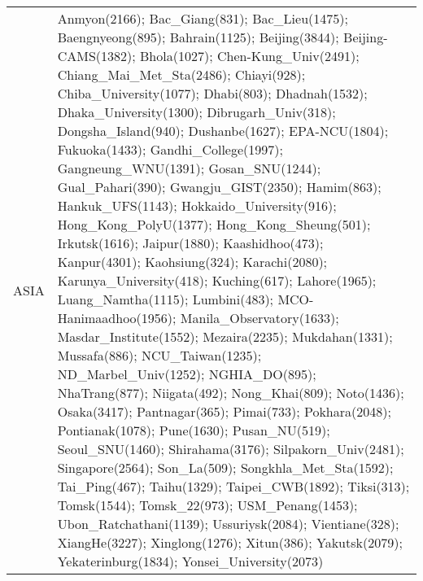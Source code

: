 \documentclass[journal abbreviation, manuscript]{copernicus}
\begin{document}
\begin{table}
\begin{tabularx}{\textwidth}{lX}
      ASIA &                                                                                                                                                                                                                                                                                                                                                                                                                                                                                                                                                                                                                                                                                                                                                        Anmyon(2166); Bac\_Giang(831); Bac\_Lieu(1475); Baengnyeong(895); Bahrain(1125); Beijing(3844); Beijing-CAMS(1382); Bhola(1027); Chen-Kung\_Univ(2491); Chiang\_Mai\_Met\_Sta(2486); Chiayi(928); Chiba\_University(1077); Dhabi(803); Dhadnah(1532); Dhaka\_University(1300); Dibrugarh\_Univ(318); Dongsha\_Island(940); Dushanbe(1627); EPA-NCU(1804); Fukuoka(1433); Gandhi\_College(1997); Gangneung\_WNU(1391); Gosan\_SNU(1244); Gual\_Pahari(390); Gwangju\_GIST(2350); Hamim(863); Hankuk\_UFS(1143); Hokkaido\_University(916); Hong\_Kong\_PolyU(1377); Hong\_Kong\_Sheung(501); Irkutsk(1616); Jaipur(1880); Kaashidhoo(473); Kanpur(4301); Kaohsiung(324); Karachi(2080); Karunya\_University(418); Kuching(617); Lahore(1965); Luang\_Namtha(1115); Lumbini(483); MCO-Hanimaadhoo(1956); Manila\_Observatory(1633); Masdar\_Institute(1552); Mezaira(2235); Mukdahan(1331); Mussafa(886); NCU\_Taiwan(1235); ND\_Marbel\_Univ(1252); NGHIA\_DO(895); NhaTrang(877); Niigata(492); Nong\_Khai(809); Noto(1436); Osaka(3417); Pantnagar(365); Pimai(733); Pokhara(2048); Pontianak(1078); Pune(1630); Pusan\_NU(519); Seoul\_SNU(1460); Shirahama(3176); Silpakorn\_Univ(2481); Singapore(2564); Son\_La(509); Songkhla\_Met\_Sta(1592); Tai\_Ping(467); Taihu(1329); Taipei\_CWB(1892); Tiksi(313); Tomsk(1544); Tomsk\_22(973); USM\_Penang(1453); Ubon\_Ratchathani(1139); Ussuriysk(2084); Vientiane(328); XiangHe(3227); Xinglong(1276); Xitun(386); Yakutsk(2079); Yekaterinburg(1834); Yonsei\_University(2073) \\

\end{tabularx}
\end{table}
\end{document}
